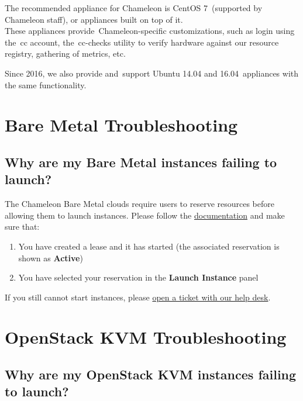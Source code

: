 The recommended appliance for Chameleon is CentOS 7~(supported by
Chameleon staff), or appliances built on top of it.\\
These appliances provide~Chameleon-specific customizations, such as
login using the~cc account, the~cc-checks utility to verify hardware
against our resource registry, gathering of metrics, etc.

Since 2016, we also provide and~support Ubuntu 14.04 and
16.04~appliances with the same functionality.

\section{Bare Metal
Troubleshooting}\label{bare-metal-troubleshooting}

\subsection{Why are my Bare Metal instances failing to
launch?}\label{why-are-my-bare-metal-instances-failing-to-launch}

The Chameleon Bare Metal clouds require users to reserve resources
before allowing them to launch instances. Please follow the
\href{https://www.chameleoncloud.org/docs/bare-metal/}{documentation}
and make sure that:

\begin{enumerate}

\item
  You have created a lease and it has started (the associated
  reservation is shown as \textbf{Active})
\item
  You have selected your reservation in the \textbf{Launch Instance}
  panel
\end{enumerate}

If you still cannot start instances, please
\href{https://www.chameleoncloud.org/user/help/}{open a ticket with our
help desk}.

\section{OpenStack KVM
Troubleshooting}\label{openstack-kvm-troubleshooting}

\subsection{Why are my OpenStack KVM instances failing to
launch?}\label{why-are-my-openstack-kvm-instances-failing-to-launch}

